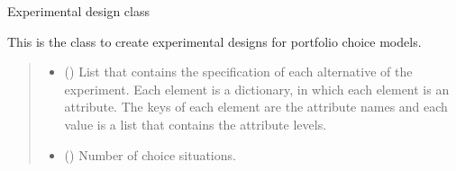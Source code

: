 \documentclass[a4paper,10pt,english]{sphinxhowto}
\begin{document}
\begin{fulllineitems}
\label{\detokenize{generated/portchoice.design:portchoice.design.PortDesign}}
\pysigstartsignatures
{}
\pysigstopsignatures
\sphinxAtStartPar
Experimental design class

\sphinxAtStartPar
This is the class to create experimental designs for portfolio choice
models.
\begin{quote}\begin{description}
\begin{itemize}
\item {} 
\sphinxAtStartPar
{} () \textendash{} List that contains the specification of each alternative of the
experiment. Each element is a dictionary, in which each element
is an attribute. The keys of each element are the attribute names
and each value is a list that contains the attribute levels.

\item {} 
\sphinxAtStartPar
{} () \textendash{} Number of choice situations.

\end{itemize}

\end{description}\end{quote}


\end{fulllineitems}
\end{document}
